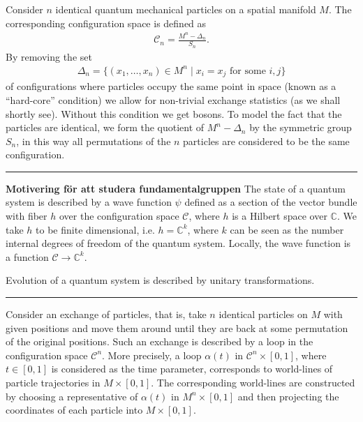 \documentclass[a4paper,10pt,oneside]{book}
\theoremstyle{plain}
\theoremstyle{definition}
\theoremstyle{remark}
\begin{document}
{ %
Consider $n$ identical quantum mechanical particles on a spatial manifold $M$.
The corresponding configuration space is defined as
\begin{align*}
  \mathcal{C}_n = \frac{M^n - \Delta_n}{S_n}.
\end{align*}
By removing the set
\begin{align*}
  \Delta_n = \{(x_1,\ldots,x_n) \in M^n \mid x_i = x_j \text{ for some } i, j\}
\end{align*}
of configurations where particles occupy the same point in space (known as a ``hard-core'' condition) we allow for non-trivial exchange statistics (as we shall shortly see). Without this condition we get bosons. To model the fact that the particles are identical, we form the quotient of $M^n - \Delta_n$ by the symmetric group $S_n$, in this way all permutations of the $n$ particles are considered to be the same configuration.

\vspace{0.5cm}
\hrule
\vspace{0.5cm}

\textbf{Motivering för att studera fundamentalgruppen} The state of a quantum system is described by a wave function $\psi$ defined as a section of the vector bundle with fiber $h$ over the configuration space $\mathcal{C}$, where $h$ is a Hilbert space over $\mathbb{C}$. We take $h$ to be finite dimensional, i.e. $h = \mathbb{C}^k$, where $k$ can be seen as the number internal degrees of freedom of the quantum system.
Locally, the wave function is a function $\mathcal{C} \to \mathbb{C}^k$.

Evolution of a quantum system is described by unitary transformations.

\vspace{0.5cm}
\hrule
\vspace{0.5cm}


Consider an exchange of particles, that is, take $n$ identical particles on $M$ with given positions and move them around until they are back at some permutation of the original positions. Such an exchange is described by a loop in the configuration space $\mathcal{C}^n$. More precisely, a loop $\alpha(t)$ in $\mathcal{C}^n\times[0,1]$, where $t \in [0,1]$ is considered as the time parameter, corresponds to world-lines of particle trajectories in $M\times[0,1]$. The corresponding world-lines are constructed by choosing a representative of $\alpha(t)$ in $M^n\times[0,1]$ and then projecting the coordinates of each particle into $M\times[0,1]$.

}
\end{document}
